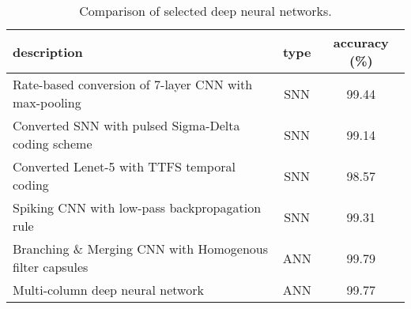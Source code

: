 \begin{table}[htbp]
    \centering
    \begin{tabularx}{\linewidth}{|>{\raggedright\arraybackslash}X|c|c|}
    \hline
        description & type & accuracy (\%) \\
        \hline
        \hline
        Rate-based conversion of 7-layer CNN with max-pooling \cite{rueckauerConversionContinuousValuedDeep2017} & SNN & 99.44 \\
        \hline
        Converted SNN with pulsed Sigma-Delta coding scheme \cite{zambranoFastEfficientAsynchronous2016} & SNN & 99.14 \\
        \hline
        Converted Lenet-5 with TTFS temporal coding \cite{rueckauerConversionAnalogSpiking2018} & SNN & 98.57 \\
        \hline
        Spiking CNN with low-pass backpropagation rule \cite{leeTrainingDeepSpiking2016} & SNN & 99.31 \\
        \hline
        Branching \& Merging CNN with Homogenous filter capsules \cite{kalganovaBranchingMerging20} & ANN & 99.79 \\
        \hline
        Multi-column deep neural network \cite{cireganMulticolumnDeep12} & ANN & 99.77 \\
    \hline
    \end{tabularx}
    \caption{Comparison of selected deep neural networks.}
    \label{tab:MNIST_benchmark}
\end{table}